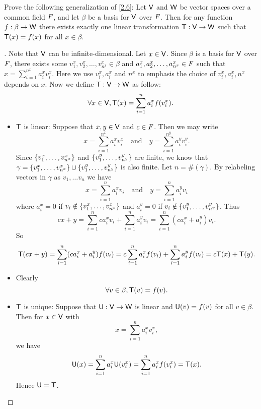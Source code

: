 \begin{ex}\label{ex:2.1.34}
	Prove the following generalization of \cref{2.6}:
	Let \(\mathsf{V}\) and \(\mathsf{W}\) be vector spaces over a common field \(\mathit{F}\), and let \(\beta\) be a basis for \(\mathsf{V}\) over \(\mathit{F}\).
	Then for any function \(f : \beta \to \mathsf{W}\) there exists exactly one linear transformation \(\mathsf{T} : \mathsf{V} \to \mathsf{W}\) such that \(\mathsf{T}(x) = f(x)\) for all \(x \in \beta\).
\end{ex}

\begin{proof}[]
	Note that \(\mathsf{V}\) can be infinite-dimensional.
	Let \(x \in \mathsf{V}\).
	Since \(\beta\) is a basis for \(\mathsf{V}\) over \(\mathit{F}\), there exists some \(v_1^x, v_2^x, \dots, v_{n^x}^x \in \beta\) and \(a_1^x, a_2^x, \dots, a_{n^x}^x \in \mathit{F}\) such that \(x = \sum_{i = 1}^{n^x} a_i^x v_i^x\).
	Here we use \(v_i^x, a_i^x\) and \(n^x\) to emphasis the choice of \(v_i^x, a_i^x, n^x\) depends on \(x\).
	Now we define \(\mathsf{T} : \mathsf{V} \to \mathsf{W}\) as follow:
	\[
		\forall x \in \mathsf{V}, \mathsf{T}(x) = \sum_{i = 1}^n a_i^x f(v_i^x).
	\]
	\begin{itemize}
		\item \(\mathsf{T}\) is linear:
		      Suppose that \(x, y \in \mathsf{V}\) and \(c \in \mathit{F}\).
		      Then we may write
		      \[
			      x = \sum_{i = 1}^{n^x} a_i^x v_i^x \quad \text{and} \quad y = \sum_{i = 1}^{n^y} a_i^y v_i^y.
		      \]
		      Since \(\left\lbrace v_1^x, \dots, v_{n^x}^x\right\rbrace\) and \(\left\lbrace v_1^y, \dots, v_{n^y}^y\right\rbrace\) are finite, we know that \(\gamma = \left\lbrace v_1^x, \dots, v_{n^x}^x\right\rbrace \cup \left\lbrace v_1^y, \dots, v_{n^y}^y\right\rbrace\) is also finite.
		      Let \(n = \#(\gamma)\).
		      By relabeling vectors in \(\gamma\) as \(v_1, \dots v_n\) we have
		      \[
			      x = \sum_{i = 1}^n a_i^x v_i \quad \text{and} \quad y = \sum_{i = 1}^n a_i^y v_i
		      \]
		      where \(a_i^x = 0\) if \(v_i \notin \left\lbrace v_1^x, \dots, v_{n^x}^x\right\rbrace\) and \(a_i^y = 0\) if \(v_i \notin \left\lbrace v_1^y, \dots, v_{n^y}^y\right\rbrace\).
		      Thus
		      \[
			      cx + y = \sum_{i = 1}^n c a_i^x v_i + \sum_{i = 1}^n a_i^y v_i = \sum_{i = 1}^n (c a_i^x + a_i^y) v_i.
		      \]
		      So
		      \[
			      \mathsf{T}(cx + y) = \sum_{i = 1}^n (c a_i^x + a_i^y) f(v_i) = c \sum_{i = 1}^n a_i^x f(v_i) + \sum_{i = 1}^n a_i^y f(v_i) = c \mathsf{T}(x) + \mathsf{T}(y).
		      \]
		\item Clearly
		      \[
			      \forall v \in \beta, \mathsf{T}(v) = f(v).
		      \]
		\item \(\mathsf{T}\) is unique:
		      Suppose that \(\mathsf{U} : \mathsf{V} \to \mathsf{W}\) is linear and \(\mathsf{U}(v) = f(v)\) for all \(v \in \beta\).
		      Then for \(x \in \mathsf{V}\) with
		      \[
			      x = \sum_{i = 1}^n a_i^x v_i^x,
		      \]
		      we have
		      \[
			      \mathsf{U}(x) = \sum_{i = 1}^n a_i^x \mathsf{U}(v_i^x) = \sum_{i = 1}^n a_i^x f(v_i^x) = \mathsf{T}(x).
		      \]
		      Hence \(\mathsf{U} = \mathsf{T}\).
	\end{itemize}
\end{proof}

